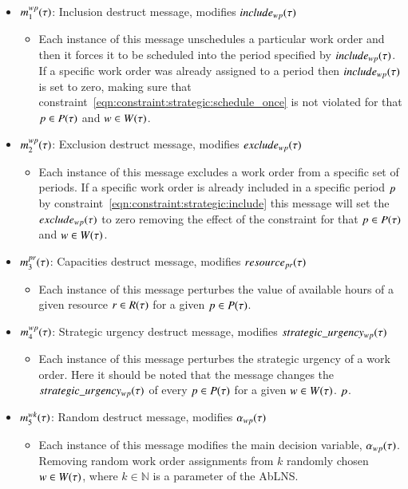 \begin{itemize}
	\item $m^{wp}_{1}(\tau)$: Inclusion destruct message, modifies $include_{wp}(\tau)$	
	\begin{itemize}
		\item Each instance of this message unschedules a particular work order and then it forces
			it to be scheduled into the period specified by $include_{wp}(\tau)$. If a
			specific work order was already assigned to a period then $include_{wp}(\tau)$ is set
			to zero, making sure that constraint~\ref{eqn:constraint:strategic:schedule_once}
			is not violated for that $p \in P(\tau)$ and $\ElementWorkOrder \in \SetWorkOrder$. 
	\end{itemize}
	\item $m^{wp}_{2}(\tau)$: Exclusion destruct message, modifies $exclude_{wp}(\tau)$
	\begin{itemize}
		\item Each instance of this message excludes a work order from a specific set of periods.
			If a specific work order is already included in a specific period $p$ by 
			constraint~\ref{eqn:constraint:strategic:include}
			this message will set the $exclude_{wp}(\tau)$ to zero removing the effect of the constraint 
			for that $p \in P(\tau)$ and $\ElementWorkOrder \in \SetWorkOrder$. 
	\end{itemize}
	\item $m^{pr}_{3}(\tau)$: Capacities destruct message, modifies $\ParStrategicResource$
	\begin{itemize}
		\item Each instance of this message perturbes the value of available hours of a given resource $r \in R(\tau)$ for
			a given $p \in P(\tau)$.
	\end{itemize}
	\item $m^{wp}_{4}(\tau)$: Strategic urgency destruct message, modifies $strategic\_urgency_{w p}(\tau)$
	\begin{itemize}
		\item Each instance of this message perturbes the strategic urgency of a work order. Here it should be noted that the
			message changes the $strategic\_urgency_{w p}(\tau)$ of every $p \in P(\tau)$ for a given $\ElementWorkOrder \in \SetWorkOrder$. $p$. 
	\end{itemize}
	\item $m^{wk}_{5}(\tau)$: Random destruct message, modifies $\alpha_{wp}(\tau)$
	\begin{itemize}
		\item Each instance of this message modifies the main decision variable, $\alpha_{wp}(\tau)$. 
			Removing random work order assignments from $k$ randomly chosen $\ElementWorkOrder \in \SetWorkOrder$, where $k \in \mathbb{N}$ is a parameter of the AbLNS.	
	\end{itemize}
\end{itemize}

